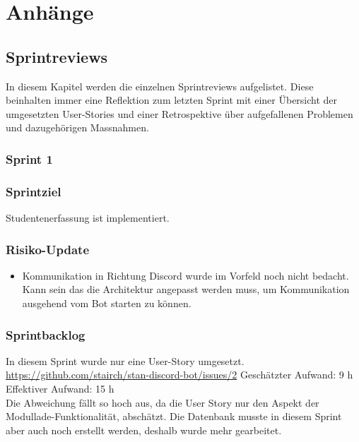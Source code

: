 \documentclass[a4paper, table]{article}
\begin{document}
\newpage
\section{Anh\"ange}

\subsection{Sprintreviews}\label{Sprintreviews}
In diesem Kapitel werden die einzelnen Sprintreviews aufgelistet.
Diese beinhalten immer eine Reflektion zum letzten Sprint mit einer Übersicht der umgesetzten User-Stories und
einer Retrospektive über aufgefallenen Problemen und dazugehörigen Massnahmen.

\subsubsection{Sprint 1}
\subsubsection*{Sprintziel}
Studentenerfassung ist implementiert.

\subsubsection*{Risiko-Update}
\begin{itemize}
    \item Kommunikation in Richtung Discord wurde im Vorfeld noch nicht bedacht.
    Kann sein das die Architektur angepasst werden muss, um Kommunikation ausgehend vom Bot starten zu können.
\end{itemize}

\subsubsection*{Sprintbacklog}
In diesem Sprint wurde nur eine User-Story umgesetzt.\\
\url{https://github.com/stairch/stan-discord-bot/issues/2}
\newline
Geschätzter Aufwand: 9 h
\newline
Effektiver Aufwand: 15 h\\
Die Abweichung fällt so hoch aus, da die User Story nur den Aspekt der Modullade-Funktionalität, abschätzt.
Die Datenbank musste in diesem Sprint aber auch noch erstellt werden, deshalb wurde mehr gearbeitet.
\end{document}

